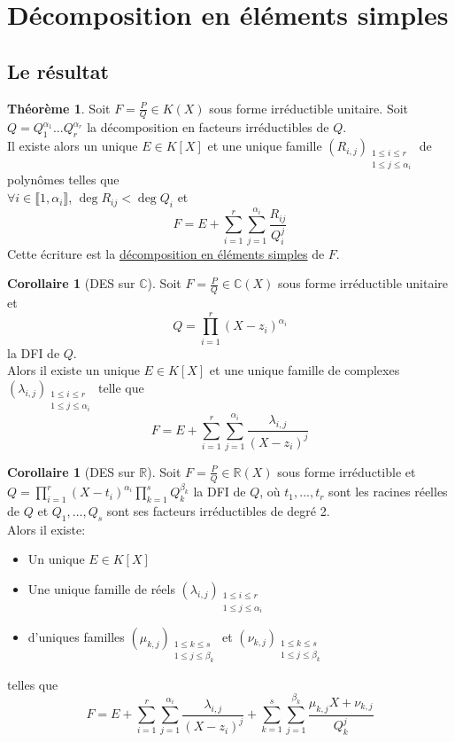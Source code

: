 \documentclass[10pt,a4paper]{article}
\theoremstyle{definition}
\newtheorem{theorem}[proposition]{Théorème}
\newtheorem{corollaire}[proposition]{Corollaire}
\begin{document}
\section{Décomposition en éléments simples}
\subsection{Le résultat}
\begin{theorem}
Soit $F = \frac{P}{Q} \in K(X)$ sous forme irréductible unitaire. Soit $Q = Q_1^{\alpha_1} ... Q_r^{\alpha_r}$ la décomposition en facteurs irréductibles de $Q$. \\
Il existe alors un unique $E \in K[X]$ et une unique famille $(R_{i, j})_{\substack{1 \leq i \leq r \\ 1 \leq j \leq \alpha_i}}$ de polynômes telles que \\
$\forall i \in \llbracket 1, \alpha_i \rrbracket$, $\deg{R_{ij}} < \deg{Q_i}$ et
\[F = E + \sum\limits_{i = 1}^r \sum\limits_{j = 1}^{\alpha_i} \frac{R_{ij}}{Q_i^j}\]
Cette écriture est la \uline{décomposition en éléments simples} de $F$.
\end{theorem}
\begin{corollaire}[DES sur $\mathbb{C}$]
Soit $F = \frac{P}{Q} \in \mathbb{C}(X)$ sous forme irréductible unitaire et
\[Q = \prod\limits_{i = 1}^r (X - z_i)^{\alpha_i}\]
la DFI de $Q$. \\
Alors il existe un unique $E \in K[X]$ et une unique famille de complexes $(\lambda_{i,j})_{\substack{1 \leq i \leq r \\ 1 \leq j \leq \alpha_i}}$ telle que
\[F = E + \sum\limits_{i = 1}^r \sum\limits_{j = 1}^{\alpha_i} \frac{\lambda_{i,j}}{(X - z_i)^j}\]
\end{corollaire}
\begin{corollaire}[DES sur $\mathbb{R}$]
Soit $F = \frac{P}{Q} \in \mathbb{R}(X)$ sous forme irréductible et $Q = \prod\limits_{i = 1}^r (X - t_i)^{\alpha_i} \prod\limits_{k = 1}^s Q_k^{\beta_k}$ la DFI de $Q$, où $t_1, ... ,t_r$ sont les racines réelles de $Q$ et $Q_1, ... ,Q_s$ sont ses facteurs irréductibles de degré 2. \\
Alors il existe:
\begin{itemize}
\item Un unique $E \in K[X]$
\item Une unique famille de réels $(\lambda_{i,j})_{\substack{1 \leq i \leq r \\ 1 \leq j \leq \alpha_i}}$
\item d'uniques familles $(\mu_{k,j})_{\substack{1 \leq k \leq s \\ 1 \leq j \leq \beta_k}}$ et $(\nu_{k,j})_{\substack{1 \leq k \leq s \\ 1 \leq j \leq \beta_k}}$
\end{itemize}
telles que
\[F = E + \sum\limits_{i = 1}^r \sum\limits_{j = 1}^{\alpha_i} \frac{\lambda_{i,j}}{(X - z_i)^j} + \sum\limits_{k = 1}^s \sum\limits_{j = 1}^{\beta_k} \frac{\mu_{k,j} X + \nu_{k, j}}{Q_k^j}\]
\end{corollaire}
\end{document}
